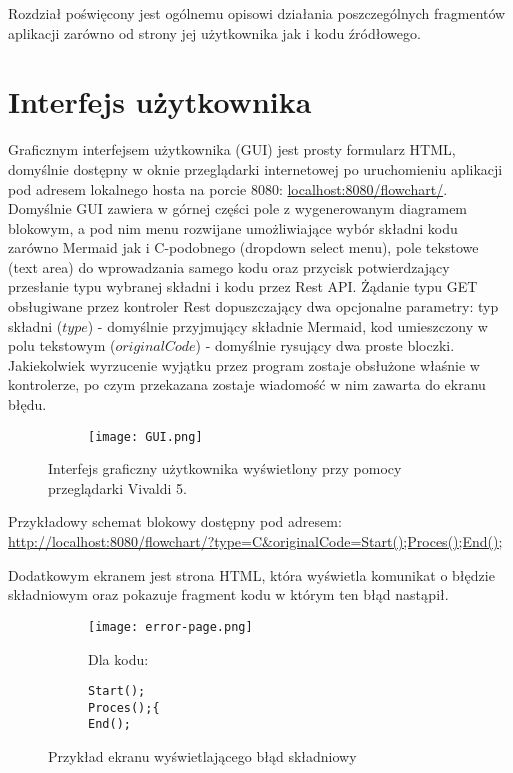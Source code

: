 	Rozdział poświęcony jest ogólnemu opisowi działania poszczególnych fragmentów aplikacji zarówno od strony jej użytkownika jak i kodu źródłowego.

\section{Interfejs użytkownika}
	Graficznym interfejsem użytkownika (GUI) jest prosty formularz HTML, domyślnie dostępny w oknie przeglądarki internetowej po uruchomieniu aplikacji pod adresem lokalnego hosta na porcie 8080: 
	\smallbreak
	\href{http://localhost:8080/flowchart/}{localhost:8080/flowchart/}.
	\bigbreak	
	Domyślnie GUI zawiera w górnej części pole z wygenerowanym diagramem blokowym, a pod nim  menu rozwijane umożliwiające wybór składni kodu zarówno Mermaid jak i C-podobnego (dropdown select menu), pole tekstowe (text area) do wprowadzania samego kodu oraz przycisk potwierdzający przesłanie typu wybranej składni i kodu przez Rest API. Żądanie typu GET obsługiwane przez kontroler Rest dopuszczający dwa opcjonalne parametry: typ składni ($type$) - domyślnie przyjmujący składnie Mermaid, kod umieszczony w polu tekstowym ($originalCode$) - domyślnie rysujący dwa proste bloczki. Jakiekolwiek wyrzucenie wyjątku przez program zostaje obsłużone właśnie w kontrolerze, po czym przekazana zostaje wiadomość w nim zawarta do ekranu błędu.

	
\begin{figure}[H]
  \begin{subfigure}{\textwidth}
    \centering
    \texttt{[image: GUI.png]}
  \end{subfigure}\hfill
  \caption{Interfejs graficzny użytkownika wyświetlony przy pomocy przeglądarki Vivaldi 5. }
\end{figure}

Przykładowy schemat blokowy dostępny pod adresem: 
	\smallbreak
	\href{http://localhost:8080/flowchart/?type=C\&originalCode=Start();Proces();End();}{http://localhost:8080/flowchart/?type=C\&originalCode=Start();Proces();End();}
	\bigbreak
	
	Dodatkowym ekranem jest strona HTML, która wyświetla komunikat o błędzie składniowym oraz pokazuje fragment kodu w którym ten błąd nastąpił.
	
\begin{figure}[H]
  \begin{subfigure}{\textwidth}
  \centering
    \texttt{[image: error-page.png]}
  \end{subfigure}\hfill
    \begin{subfigure}[t]{0.44\textwidth}
    \bigbreak
    Dla kodu:
    \centering
    \begin{verbatim}    
Start();
Proces();{
End();
    \end{verbatim}
  \end{subfigure}%
  \caption{Przykład ekranu wyświetlającego błąd składniowy}
\end{figure}



